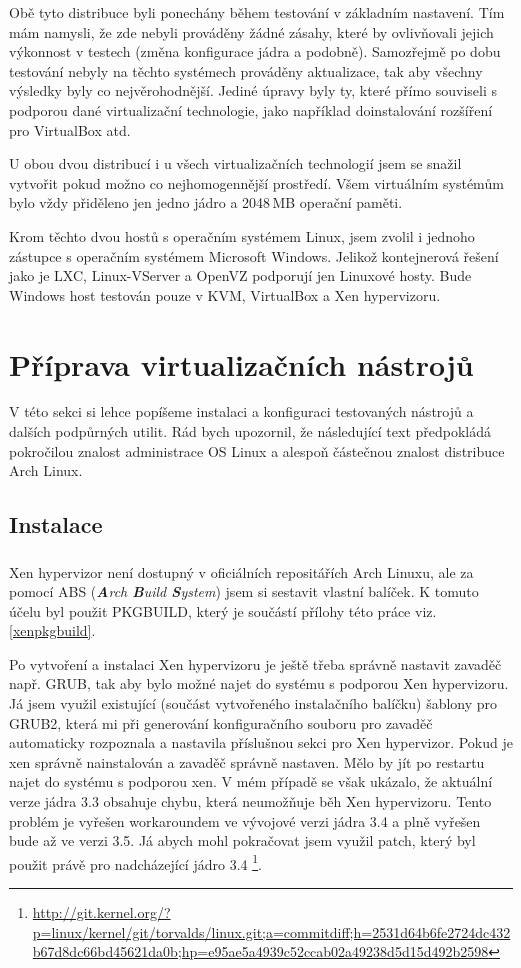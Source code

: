 Obě tyto distribuce byli ponechány během testování v základním nastavení. Tím mám namysli, že zde nebyli prováděny žádné zásahy, které by ovlivňovali jejich výkonnost v testech (změna konfigurace jádra a podobně). Samozřejmě po dobu testování nebyly na těchto systémech prováděny aktualizace, tak aby všechny výsledky byly co nejvěrohodnější. Jediné úpravy byly ty, které přímo souviseli s podporou dané virtualizační technologie, jako například doinstalování rozšíření pro VirtualBox atd.

U obou dvou distribucí i u všech virtualizačních technologií jsem se snažil vytvořit pokud možno co nejhomogennější prostředí. Všem virtuálním systémům bylo vždy přiděleno jen jedno jádro a 2048\,MB operační paměti.

Krom těchto dvou hostů s operačním systémem Linux, jsem zvolil i jednoho zástupce s operačním systémem Microsoft Windows. Jelikož kontejnerová řešení jako je LXC, Linux-VServer a OpenVZ podporují jen Linuxové hosty. Bude Windows host testován pouze v KVM, VirtualBox a Xen hypervizoru.

\section{Příprava virtualizačních nástrojů}
V této sekci si lehce popíšeme instalaci a konfiguraci testovaných nástrojů a dalších podpůrných utilit. Rád bych upozornil, že následující text předpokládá pokročilou znalost administrace OS Linux a alespoň částečnou znalost distribuce Arch Linux.
\subsection{Instalace}
\subsubsection{\xen}
Xen hypervizor není dostupný v oficiálních repositářích Arch Linuxu, ale za pomocí ABS (\emph{\textbf{A}rch \textbf{B}uild \textbf{S}ystem}) jsem si sestavit vlastní balíček. K tomuto účelu byl použit PKGBUILD, který je součástí přílohy této práce viz. \ref{xenpkgbuild}.

Po vytvoření a instalaci Xen hypervizoru je ještě třeba správně nastavit zavaděč např. GRUB, tak aby bylo možné najet do systému s podporou Xen hypervizoru. Já jsem využil existující (součást vytvořeného instalačního balíčku) šablony pro GRUB2, která mi při generování konfiguračního souboru pro zavaděč automaticky rozpoznala a nastavila příslušnou sekci pro Xen hypervizor.
\newpage
Pokud je xen správně nainstalován a zavaděč správně nastaven. Mělo by jít po restartu najet do systému s podporou xen. V mém případě se však ukázalo, že aktuální verze jádra 3.3 obsahuje chybu, která neumožňuje běh Xen hypervizoru. Tento problém je vyřešen workaroundem ve vývojové verzi jádra 3.4 a plně vyřešen bude až ve verzi 3.5. Já abych mohl pokračovat jsem využil patch, který byl použit právě pro nadcházející jádro 3.4 \footnote{\url{http://git.kernel.org/?p=linux/kernel/git/torvalds/linux.git;a=commitdiff;h=2531d64b6fe2724dc432b67d8dc66bd45621da0b;hp=e95ae5a4939c52ccab02a49238d5d15d492b2598}}.

